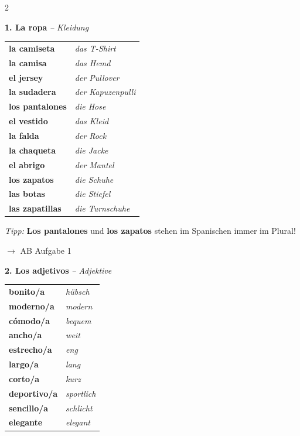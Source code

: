 \documentclass[11pt, a4paper]{article}
\newcommand{\seriftext}[1]{{\fontfamily{ppl}\selectfont #1}}
\newcommand{\es}[1]{\seriftext{\textbf{#1}}}
\newcommand{\de}[1]{\textit{\textcolor{akzent}{#1}}}
\newcommand{\abmark}[1]{{\footnotesize\textcolor{akzent}{$\rightarrow$ AB #1}}}
\begin{document}
\begin{multicols}{2}

\textbf{\large 1. La ropa} \de{-- Kleidung}

\vspace{4pt}

\begin{tabular}{@{}ll@{}}
\es{la camiseta} & \de{das T-Shirt} \\[0.4em]
\es{la camisa} & \de{das Hemd} \\[0.4em]
\es{el jersey} & \de{der Pullover} \\[0.4em]
\es{la sudadera} & \de{der Kapuzenpulli} \\[0.4em]
\es{los pantalones} & \de{die Hose} \\[0.4em]
\es{el vestido} & \de{das Kleid} \\[0.4em]
\es{la falda} & \de{der Rock} \\[0.4em]
\es{la chaqueta} & \de{die Jacke} \\[0.4em]
\es{el abrigo} & \de{der Mantel} \\[0.4em]
\es{los zapatos} & \de{die Schuhe} \\[0.4em]
\es{las botas} & \de{die Stiefel} \\[0.4em]
\es{las zapatillas} & \de{die Turnschuhe} \\
\end{tabular}

\vspace{4pt}
{\footnotesize\textit{Tipp:} \es{Los pantalones} und \es{los zapatos} stehen im Spanischen immer im Plural!}

\abmark{Aufgabe 1}

\vspace{8pt}

\textbf{\large 2. Los adjetivos} \de{-- Adjektive}

\vspace{4pt}

\begin{tabular}{@{}ll@{}}
\es{bonito/a} & \de{hübsch} \\[0.4em]
\es{moderno/a} & \de{modern} \\[0.4em]
\es{cómodo/a} & \de{bequem} \\[0.4em]
\es{ancho/a} & \de{weit} \\[0.4em]
\es{estrecho/a} & \de{eng} \\[0.4em]
\es{largo/a} & \de{lang} \\[0.4em]
\es{corto/a} & \de{kurz} \\[0.4em]
\es{deportivo/a} & \de{sportlich} \\[0.4em]
\es{sencillo/a} & \de{schlicht} \\[0.4em]
\es{elegante} & \de{elegant} \\
\end{tabular}


\end{multicols}
\end{document}
